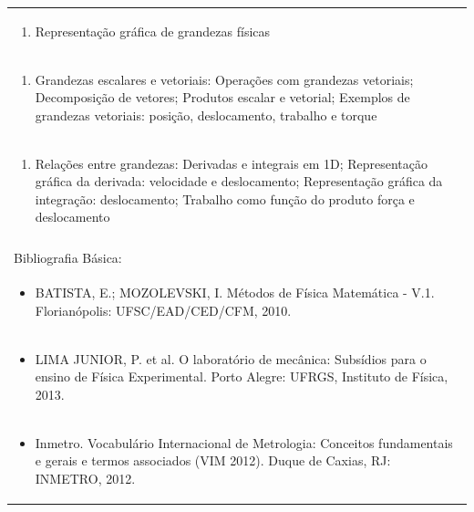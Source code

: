 \documentclass[11pt]{article}
\begin{document}
\begin{center}
\begin{longtable}{|p{4cm}|p{4cm}|p{4cm}|p{4cm}|}
\multicolumn{4}{|p{\dimexpr 16cm + 6\tabcolsep\relax}|}{\begin{enumerate}[start=2]\item Representação gráfica de grandezas físicas\end{enumerate}}\\
\multicolumn{4}{|p{\dimexpr 16cm + 6\tabcolsep\relax}|}{\begin{enumerate}[start=3]\item Grandezas escalares e vetoriais: Operações com grandezas vetoriais; Decomposição de vetores; Produtos escalar e vetorial; Exemplos de grandezas vetoriais: posição, deslocamento, trabalho e torque\end{enumerate}}\\
\multicolumn{4}{|p{\dimexpr 16cm + 6\tabcolsep\relax}|}{\begin{enumerate}[start=4]\item Relações entre grandezas: Derivadas e integrais em 1D; Representação gráfica da derivada: velocidade e deslocamento; Representação gráfica da integração: deslocamento; Trabalho como função do produto força e deslocamento\end{enumerate}}\\
\multicolumn{4}{|p{\dimexpr 16cm + 6\tabcolsep\relax}|}{}\\
\hline
\multicolumn{4}{|p{16cm}|}{Bibliografia Básica:}\\*
\multicolumn{4}{|p{\dimexpr 16cm + 6\tabcolsep\relax}|}{\begin{itemize}\item BATISTA, E.; MOZOLEVSKI, I. Métodos de Física Matemática - V.1. Florianópolis: UFSC/EAD/CED/CFM, 2010.\end{itemize}}\\
\multicolumn{4}{|p{\dimexpr 16cm + 6\tabcolsep\relax}|}{\begin{itemize}\item LIMA JUNIOR, P. et al. O laboratório de mecânica: Subsídios para o ensino de Física Experimental. Porto Alegre: UFRGS, Instituto de Física, 2013.\end{itemize}}\\
\multicolumn{4}{|p{\dimexpr 16cm + 6\tabcolsep\relax}|}{\begin{itemize}\item Inmetro. Vocabulário Internacional de Metrologia: Conceitos fundamentais e gerais e termos associados (VIM 2012). Duque de Caxias, RJ: INMETRO, 2012.\end{itemize}}\\

\end{longtable}
\end{center}
\end{document}
